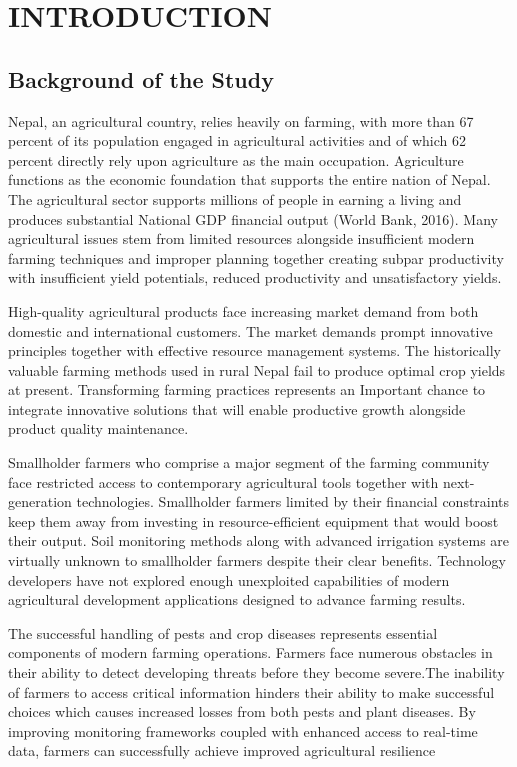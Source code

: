 \chapter{INTRODUCTION} 

\section{Background of the Study}

Nepal, an agricultural country, relies heavily on farming, with more than 67 percent of its population engaged in agricultural activities and of which 62 percent directly rely
upon agriculture as the main occupation. Agriculture functions as the economic foundation that supports the entire nation of Nepal. The agricultural sector supports millions
of people in earning a living and produces substantial National GDP financial output (World Bank, 2016). Many agricultural issues stem from limited resources alongside
insufficient modern farming techniques and improper planning together creating subpar productivity with insufficient yield potentials, reduced productivity and unsatisfactory
yields.

High-quality agricultural products face increasing market demand from both domestic and international customers. The market demands prompt innovative principles together with effective 
resource management systems. The historically valuable farming methods used in rural Nepal fail to produce optimal crop yields at present. Transforming farming practices represents an 
Important chance to integrate innovative solutions that will enable productive growth alongside product quality maintenance.

Smallholder farmers who comprise a major segment of the farming community face restricted access to contemporary agricultural tools together with next-generation technologies. 
Smallholder farmers limited by their financial constraints keep them away from investing in resource-efficient equipment that would boost their output. Soil monitoring methods 
along with advanced irrigation systems are virtually unknown to smallholder farmers despite their clear benefits. Technology developers have not explored enough unexploited capabilities 
of modern agricultural development applications designed to advance farming results.

The successful handling of pests and crop diseases represents essential components of modern farming operations. Farmers face numerous obstacles in their ability to detect developing
threats before they become severe.The inability of farmers to access critical information hinders their ability to make successful choices which causes increased losses from both pests
and plant diseases. By improving monitoring frameworks coupled with enhanced access to real-time data, farmers can successfully achieve improved agricultural resilience

